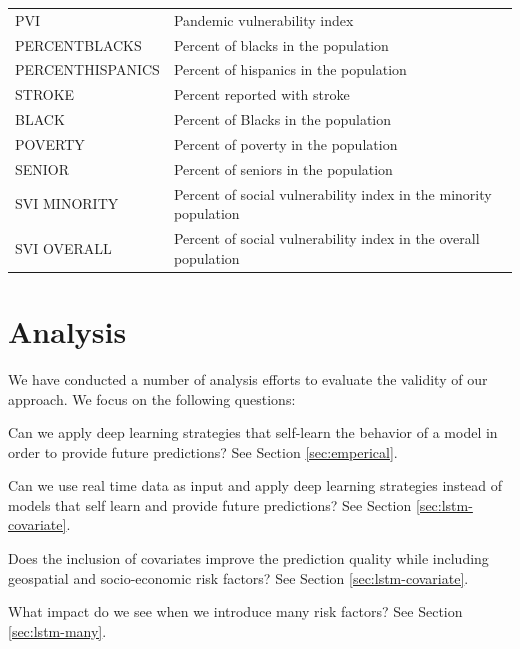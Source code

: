 \documentclass[letterpaper, inpress]{jds} %
\renewcommand{\_}{%
    \textunderscore\hspace{0pt}%
}
\begin{document}
\begin{table}[!hptb]
{\begin{tabular}{ll}
 PVI 		  & Pandemic vulnerability index \\
 PERCENTBLACKS 	  & Percent of blacks in the population\\
 PERCENTHISPANICS & Percent of hispanics in the population\\
 STROKE 	  & Percent reported with stroke\\
 BLACK	  & Percent of Blacks in the population\\
 POVERTY & Percent of poverty in the population\\
 SENIOR  & Percent of seniors in the population\\
 SVI\_MINORITY 	  & Percent of social vulnerability index in the minority population\\
 SVI\_OVERALL 	  & Percent of social vulnerability index in the overall population\\
\bottomrule
\end{tabular}
}
\end{table}


\section{Analysis}

We have conducted a number of analysis efforts to evaluate the validity of our approach. We focus on the following questions:

\begin{question} Can we apply deep learning strategies that self-learn the behavior of a model in order to provide future predictions? See Section \ref{sec:emperical}.
\label{q:1}
\end{question}

\begin{question} Can we use real time data as input and apply deep learning strategies instead of models that self learn and provide future predictions? See Section \ref{sec:lstm-covariate}.
\label{q:2}
\end{question}

\begin{question} Does the inclusion of covariates improve the prediction quality while including geospatial and socio-economic risk factors? See Section \ref{sec:lstm-covariate}.
\label{q:3}
\end{question}

\begin{question} What impact do we see when we introduce many risk factors? See Section \ref{sec:lstm-many}.
\label{q:4}
\end{question}
\end{document}
